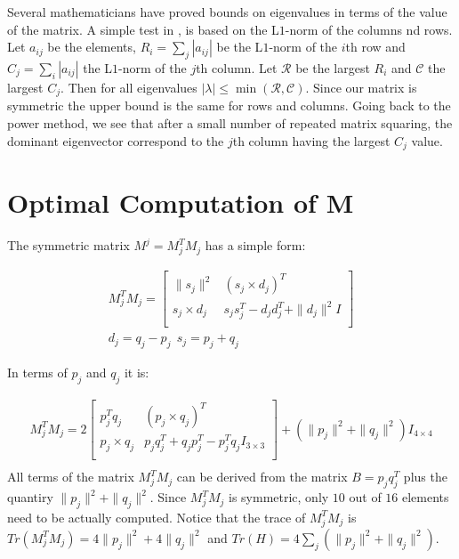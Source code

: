\documentclass{birkjour}
\numberwithin{equation}{section}
\begin{document}
Several mathematicians have proved bounds on eigenvalues in terms of the value of the matrix. A simple test in \cite{brauer1946}, is based on the L$1$-norm of the columns nd rows. Let $a_{ij}$ be the elements, $R_i = \sum_j |a_{ij}|$ be the L$1$-norm of the $i$th row and $C_j = \sum_i |a_{ij}|$ the L$1$-norm of the $j$th column. Let $\mathcal R$ be the largest $R_i$ and $\mathcal C$ the largest $C_j$. Then for all eigenvalues $|\lambda| \leq \min(\mathcal R, \mathcal C)$. Since our matrix is symmetric the upper bound is the same for rows and columns. Going back to the power method, we see that after a small number of repeated matrix squaring, the dominant eigenvector correspond to the $j$th column having the largest $C_j$ value.

\section{Optimal Computation of M}

The symmetric matrix $M^j = M_j^T M_j$ has a simple form:

\begin{eqnarray*}
	M_j^T M_j = 
	\left[\begin{array}{cc}
		\| s_j \|^2        &         (s_j \times d_j)^T \\
		s_j \times d_j  &    s_j s_j^T - d_j d_j^T + \| d_j \|^2 I \\
	\end{array}\right]\\
	d_j = q_j - p_j \ \ s_j = p_j + q_j
\end{eqnarray*}

In terms of $p_j$ and $q_j$ it is:

\begin{eqnarray*}
	M_j^T M_j = 2
	\left[\begin{array}{cc}
		p_j^T q_j       &         (p_j \times q_j)^T \\
		p_j \times q_j  &    p_j q_j^T + q_j p_j^T - p_j^Tq_j I_{3\times3} \\
	\end{array}\right]
    + (\| p_j \|^2 + \| q_j \|^2) I_{4\times4}\\
\end{eqnarray*}
All terms of the matrix $M_j^T M_j$ can be derived from the matrix $B = p_j q_j^T$ plus the quantiry $\| p_j \|^2 + \| q_j \|^2$. Since $M_j^T M_j$ is symmetric, only $10$ out of $16$ elements need to be actually computed. Notice that the trace of $M_j^T M_j$ is $Tr(M_j^T M_j) = 4 \|p_j\|^2 + 4 \|q_j\|^2$ and $Tr(H) = 4 \sum_j {(\|p_j\|^2 + \|q_j\|^2)}$.
\end{document}
